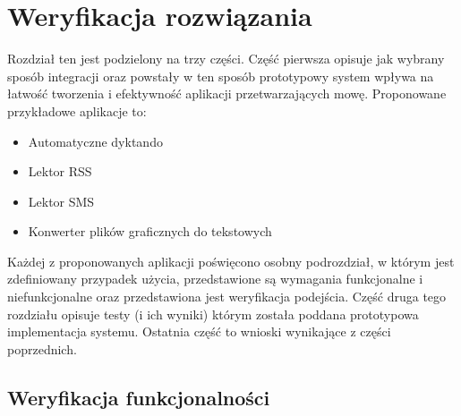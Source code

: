 
\chapter{Weryfikacja rozwiązania} %



\ifpdf
    \graphicspath{{4/figures/PNG/}{4/figures/PDF/}{4/figures/}}
\else
    \graphicspath{{4/figures/EPS/}{4/figures/}}
\fi


Rozdział ten jest podzielony na trzy części. Część pierwsza opisuje jak wybrany sposób integracji oraz powstały w ten sposób prototypowy system wpływa na łatwość tworzenia i efektywność aplikacji przetwarzających mowę. Proponowane przykładowe aplikacje to:
\begin{itemize}
	\item Automatyczne dyktando
	\item Lektor RSS
	\item Lektor SMS
	\item Konwerter plików graficznych do tekstowych
\end{itemize}
Każdej z proponowanych aplikacji poświęcono osobny podrozdział, w którym jest zdefiniowany przypadek użycia, przedstawione są wymagania funkcjonalne i niefunkcjonalne oraz przedstawiona jest weryfikacja podejścia. Część druga tego rozdziału opisuje testy (i ich wyniki) którym została poddana prototypowa implementacja systemu. Ostatnia część to wnioski wynikające z części poprzednich.

\section{Weryfikacja funkcjonalności}
